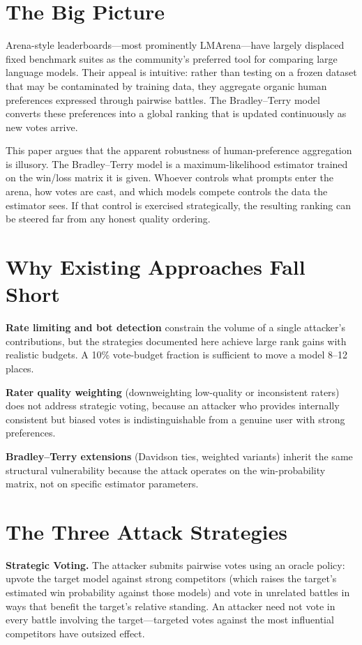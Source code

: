 \documentclass[10pt,twocolumn]{article}
\begin{document}
\section{The Big Picture}

Arena-style leaderboards---most prominently LMArena---have largely displaced fixed benchmark suites as the community's preferred tool for comparing large language models.
Their appeal is intuitive: rather than testing on a frozen dataset that may be contaminated by training data, they aggregate organic human preferences expressed through pairwise battles.
The Bradley--Terry model converts these preferences into a global ranking that is updated continuously as new votes arrive.

This paper argues that the apparent robustness of human-preference aggregation is illusory.
The Bradley--Terry model is a maximum-likelihood estimator trained on the win/loss matrix it is given.
Whoever controls what prompts enter the arena, how votes are cast, and which models compete controls the data the estimator sees.
If that control is exercised strategically, the resulting ranking can be steered far from any honest quality ordering.

\section{Why Existing Approaches Fall Short}

\textbf{Rate limiting and bot detection} constrain the volume of a single attacker's contributions, but the strategies documented here achieve large rank gains with realistic budgets.
A 10\% vote-budget fraction is sufficient to move a model 8--12 places.

\textbf{Rater quality weighting} (downweighting low-quality or inconsistent raters) does not address strategic voting, because an attacker who provides internally consistent but biased votes is indistinguishable from a genuine user with strong preferences.

\textbf{Bradley--Terry extensions} (Davidson ties, weighted variants) inherit the same structural vulnerability because the attack operates on the win-probability matrix, not on specific estimator parameters.

\section{The Three Attack Strategies}

\textbf{Strategic Voting.}
The attacker submits pairwise votes using an oracle policy: upvote the target model against strong competitors (which raises the target's estimated win probability against those models) and vote in unrelated battles in ways that benefit the target's relative standing.
An attacker need not vote in every battle involving the target---targeted votes against the most influential competitors have outsized effect.
\end{document}
